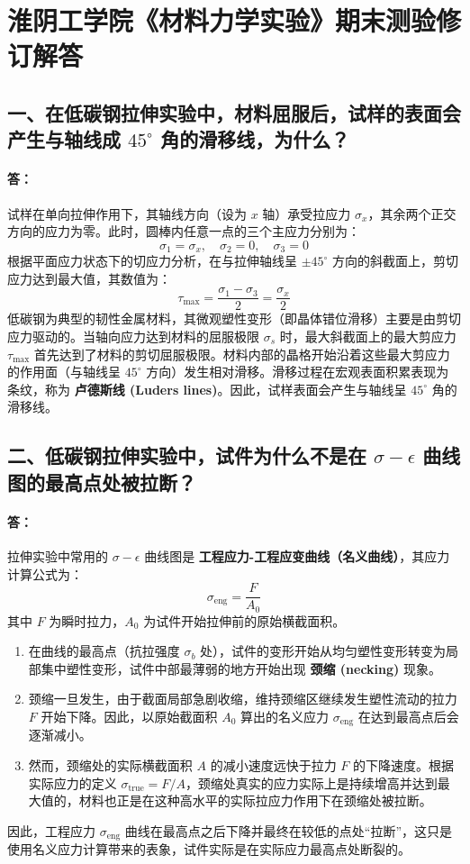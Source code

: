 \documentclass[11pt,a4paper]{ctexrep}
\begin{document}
\chapter{淮阴工学院《材料力学实验》期末测验修订解答}
{


\vspace{-1.0cm}

\section*{一、在低碳钢拉伸实验中，材料屈服后，试样的表面会产生与轴线成 $45^\circ$ 角的滑移线，为什么？}

\subsubsection*{答：}
试样在单向拉伸作用下，其轴线方向（设为 $x$ 轴）承受拉应力 $\sigma_x$，其余两个正交方向的应力为零。此时，圆棒内任意一点的三个主应力分别为：
\[
    \sigma_1 = \sigma_x, \quad \sigma_2 = 0, \quad \sigma_3 = 0
\]
根据平面应力状态下的切应力分析，在与拉伸轴线呈 $\pm 45^\circ$ 方向的斜截面上，剪切应力达到最大值，其数值为：
\[
    \tau_{\max} = \frac{\sigma_1 - \sigma_3}{2} = \frac{\sigma_x}{2}
\]
低碳钢为典型的韧性金属材料，其微观塑性变形（即晶体错位滑移）主要是由剪切应力驱动的。当轴向应力达到材料的屈服极限 $\sigma_s$ 时，最大斜截面上的最大剪应力 $\tau_{\max}$ 首先达到了材料的剪切屈服极限。材料内部的晶格开始沿着这些最大剪应力的作用面（与轴线呈 $45^\circ$ 方向）发生相对滑移。滑移过程在宏观表面积累表现为条纹，称为 \textbf{卢德斯线 (Luders lines)}。因此，试样表面会产生与轴线呈 $45^\circ$ 角的滑移线。

\section*{二、低碳钢拉伸实验中，试件为什么不是在 $\sigma-\epsilon$ 曲线图的最高点处被拉断？}

\subsubsection*{答：}
拉伸实验中常用的 $\sigma-\epsilon$ 曲线图是 \textbf{工程应力-工程应变曲线（名义曲线）}，其应力计算公式为：
\[
    \sigma_{\text{eng}} = \frac{F}{A_0}
\]
其中 $F$ 为瞬时拉力，$A_0$ 为试件开始拉伸前的原始横截面积。
\begin{enumerate}
    \item 在曲线的最高点（抗拉强度 $\sigma_b$ 处），试件的变形开始从均匀塑性变形转变为局部集中塑性变形，试件中部最薄弱的地方开始出现 \textbf{颈缩 (necking)} 现象。
    \item 颈缩一旦发生，由于截面局部急剧收缩，维持颈缩区继续发生塑性流动的拉力 $F$ 开始下降。因此，以原始截面积 $A_0$ 算出的名义应力 $\sigma_{\text{eng}}$ 在达到最高点后会逐渐减小。
    \item 然而，颈缩处的实际横截面积 $A$ 的减小速度远快于拉力 $F$ 的下降速度。根据实际应力的定义 $\sigma_{\text{true}} = F/A$，颈缩处真实的应力实际上是持续增高并达到最大值的，材料也正是在这种高水平的实际拉应力作用下在颈缩处被拉断。
\end{enumerate}
因此，工程应力 $\sigma_{\text{eng}}$ 曲线在最高点之后下降并最终在较低的点处“拉断”，这只是使用名义应力计算带来的表象，试件实际是在实际应力最高点处断裂的。

}
\end{document}
